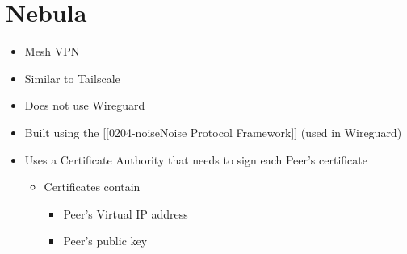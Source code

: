 \hypertarget{nebula}{%
\section{Nebula}\label{nebula}}

\begin{itemize}
\tightlist
\item
  Mesh VPN
\item
  Similar to Tailscale
\item
  Does not use Wireguard
\item
  Built using the {[}{[}0204-noise\textbar Noise Protocol
  Framework{]}{]} (used in Wireguard)
\item
  Uses a Certificate Authority that needs to sign each Peer's
  certificate

  \begin{itemize}
  \tightlist
  \item
    Certificates contain

    \begin{itemize}
    \tightlist
    \item
      Peer's Virtual IP address
    \item
      Peer's public key
    \end{itemize}
  \end{itemize}
\end{itemize}
